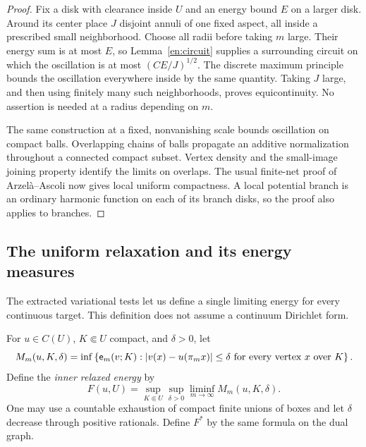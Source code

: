 \begin{proof}
Fix a disk with clearance inside $U$ and an energy bound $E$ on a larger
disk.  Around its center place $J$ disjoint annuli of one fixed aspect,
all inside a prescribed small neighborhood.  Choose all radii before
taking $m$ large.  Their energy sum is at most $E$, so
Lemma~\ref{en:circuit} supplies a surrounding circuit on which the
oscillation is at most $(CE/J)^{1/2}$.  The discrete maximum principle
bounds the oscillation everywhere inside by the same quantity.  Taking
$J$ large, and then using finitely many such neighborhoods, proves
equicontinuity.  No assertion is needed at a radius depending on $m$.

The same construction at a fixed, nonvanishing scale bounds oscillation
on compact balls.  Overlapping chains of balls propagate an additive
normalization throughout a connected compact subset.  Vertex density
and the small-image joining property identify the limits on overlaps.
The usual finite-net proof of Arzel\`a--Ascoli now gives local uniform
compactness.  A local potential branch is an ordinary harmonic function
on each of its branch disks, so the proof also applies to branches.
\end{proof}

\subsection{The uniform relaxation and its energy measures}

The extracted variational tests let us define a single limiting energy
for every continuous target.  This definition does not assume a
continuum Dirichlet form.

For $u\in C(U)$, $K\Subset U$ compact, and $\delta>0$, let
\[
 M_m(u,K,\delta)=
 \inf\left\{\mathsf e_m(v;K):
  |v(x)-u(\pi_m x)|\le\delta
  \text{ for every vertex }x\text{ over }K\right\}.
\]
Define the \emph{inner relaxed energy} by
\begin{equation}\label{en:relaxation}
 F(u,U)=\sup_{K\Subset U}\sup_{\delta>0}
                  \liminf_{m\to\infty}M_m(u,K,\delta).
\end{equation}
One may use a countable exhaustion of compact finite unions of boxes
and let $\delta$ decrease through positive rationals.  Define $F^*$ by
the same formula on the dual graph.


